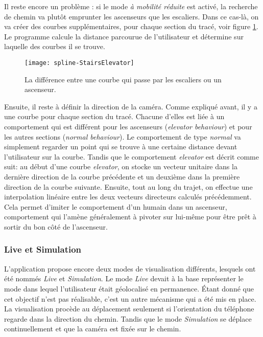 Il reste encore un problème : si le mode \textit{à mobilité réduite} est activé, la recherche de chemin va plutôt emprunter les ascenseurs que les escaliers. Dans ce cas-là, on va créer des courbes supplémentaires, pour chaque section du tracé, voir figure \ref{fig:spline-stairselevator}. Le programme calcule la distance parcourue de l'utilisateur et détermine sur laquelle des courbes il se trouve.

\begin{figure}
	\centering
	\texttt{[image: spline-StairsElevator]}
	\caption{La différence entre une courbe qui passe par les escaliers ou un ascenseur.}
	\label{fig:spline-stairselevator}
\end{figure}

Ensuite, il reste à définir la direction de la caméra. Comme expliqué avant, il y a une courbe pour chaque section du tracé. Chacune d'elles est liée à un comportement qui est différent pour les ascenseurs (\textit{elevator behaviour}) et pour les autres sections (\textit{normal behaviour}). Le comportement de type \emph{normal} va simplement regarder un point qui se trouve à une certaine distance devant l'utilisateur sur la courbe. Tandis que le comportement \emph{elevator} est décrit comme suit: 
au début d'une courbe \emph{elevator}, on stocke un vecteur unitaire dans la dernière direction de la courbe précédente et un deuxième dans la première direction de la courbe suivante. Ensuite, tout au long du trajet, on effectue une interpolation linéaire entre les deux vecteurs directeurs calculés précédemment. Cela permet d'imiter le comportement d'un humain dans un ascenseur, comportement qui l'amène généralement à pivoter sur lui-même pour être prêt à sortir du bon côté de l'ascenseur.

\subsubsection{Live et Simulation}
L'application propose encore deux modes de visualisation différents, lesquels ont été nommés \emph{Live} et \emph{Simulation}. Le mode \emph{Live} devait à la base représenter le mode dans lequel l'utilisateur était géolocalisé en permanence. Étant donné que cet objectif n'est pas réalisable, c'est un autre mécanisme qui a été mis en place. La visualisation procède au déplacement seulement si l'orientation du téléphone regarde dans la direction du chemin. Tandis que le mode \emph{Simulation} se déplace continuellement et que la caméra est fixée sur le chemin.
